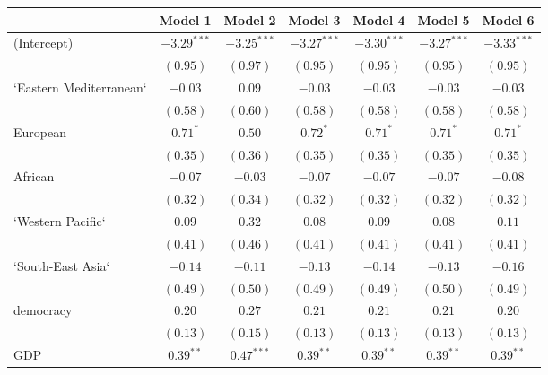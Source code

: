 
\begin{table}[!h]
\begin{center}
\begin{tabular}{l c c c c c c }
\toprule
 & Model 1 & Model 2 & Model 3 & Model 4 & Model 5 & Model 6 \\
\midrule
(Intercept)             & $-3.29^{***}$ & $-3.25^{***}$ & $-3.27^{***}$ & $-3.30^{***}$ & $-3.27^{***}$ & $-3.33^{***}$ \\
                        & $(0.95)$      & $(0.97)$      & $(0.95)$      & $(0.95)$      & $(0.95)$      & $(0.95)$      \\
`Eastern Mediterranean` & $-0.03$       & $0.09$        & $-0.03$       & $-0.03$       & $-0.03$       & $-0.03$       \\
                        & $(0.58)$      & $(0.60)$      & $(0.58)$      & $(0.58)$      & $(0.58)$      & $(0.58)$      \\
European                & $0.71^{*}$    & $0.50$        & $0.72^{*}$    & $0.71^{*}$    & $0.71^{*}$    & $0.71^{*}$    \\
                        & $(0.35)$      & $(0.36)$      & $(0.35)$      & $(0.35)$      & $(0.35)$      & $(0.35)$      \\
African                 & $-0.07$       & $-0.03$       & $-0.07$       & $-0.07$       & $-0.07$       & $-0.08$       \\
                        & $(0.32)$      & $(0.34)$      & $(0.32)$      & $(0.32)$      & $(0.32)$      & $(0.32)$      \\
`Western Pacific`       & $0.09$        & $0.32$        & $0.08$        & $0.09$        & $0.08$        & $0.11$        \\
                        & $(0.41)$      & $(0.46)$      & $(0.41)$      & $(0.41)$      & $(0.41)$      & $(0.41)$      \\
`South-East Asia`       & $-0.14$       & $-0.11$       & $-0.13$       & $-0.14$       & $-0.13$       & $-0.16$       \\
                        & $(0.49)$      & $(0.50)$      & $(0.49)$      & $(0.49)$      & $(0.50)$      & $(0.49)$      \\
democracy               & $0.20$        & $0.27$        & $0.21$        & $0.21$        & $0.21$        & $0.20$        \\
                        & $(0.13)$      & $(0.15)$      & $(0.13)$      & $(0.13)$      & $(0.13)$      & $(0.13)$      \\
GDP                     & $0.39^{**}$   & $0.47^{***}$  & $0.39^{**}$   & $0.39^{**}$   & $0.39^{**}$   & $0.39^{**}$   \\

\end{tabular}
\end{center}
\end{table}
